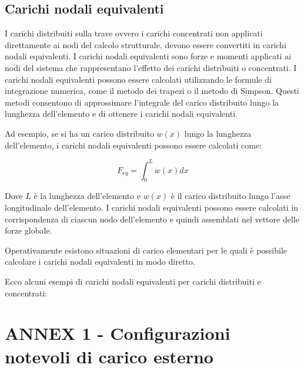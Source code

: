 \documentclass[10pt,a4paper]{article}
\begin{document}
\subsection{Carichi nodali equivalenti}
\label{sec:carichi_nodali_equivalenti}
I carichi distribuiti sulla trave ovvero i carichi concentrati non applicati direttamente ai nodi del calcolo strutturale, devono essere convertiti in carichi nodali equivalenti. I carichi nodali equivalenti sono forze e momenti applicati ai nodi del sistema che rappresentano l'effetto dei carichi distribuiti o concentrati.
I carichi nodali equivalenti possono essere calcolati utilizzando le formule di integrazione numerica, come il metodo dei trapezi o il metodo di Simpson. Questi metodi consentono di approssimare l'integrale del carico distribuito lungo la lunghezza dell'elemento e di ottenere i carichi nodali equivalenti.

Ad esempio, se si ha un carico distribuito $w(x)$ lungo la lunghezza dell'elemento, i carichi nodali equivalenti possono essere calcolati come:

\begin{equation}
    F_{eq} = \int_0^L w(x) dx
\end{equation}

Dove $L$ è la lunghezza dell'elemento e $w(x)$ è il carico distribuito lungo l'asse longitudinale dell'elemento. I carichi nodali equivalenti possono essere calcolati in corrispondenza di ciascun nodo dell'elemento e quindi assemblati nel vettore delle forze globale.

Operativamente esistono situazioni di carico elementari per le quali è possibile calcolare i carichi nodali equivalenti in modo diretto.

Ecco alcuni esempi di carichi nodali equivalenti per carichi distribuiti e concentrati:

\section*{ANNEX 1 - Configurazioni notevoli di carico esterno}
\end{document}

